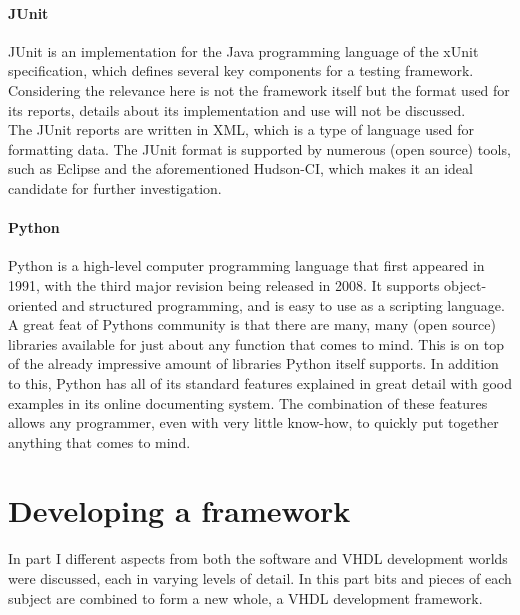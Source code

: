 \documentclass[11pt,british]{article}
\begin{document}
\subsection{JUnit}
JUnit is an implementation for the Java programming language of the xUnit specification, which defines several key components for a testing framework. Considering the relevance here is not the framework itself but the format used for its reports, details about its implementation and use will not be discussed.\\
The JUnit reports are written in \gls{XML}, which is a type of language used for formatting data. The JUnit format is supported by numerous (open source) tools, such as Eclipse and the aforementioned Hudson-CI, which makes it an ideal candidate for further investigation. 

\subsection{Python}
Python is a high-level computer programming language that first appeared in 1991, with the third major revision being released in 2008. It supports object-oriented and structured programming, and is easy to use as a scripting language. A great feat of Pythons community is that there are many, many (open source) libraries available for just about any function that comes to mind. This is on top of the already impressive amount of libraries Python itself supports. In addition to this, Python has all of its standard features explained in great detail with good examples in its online documenting system. The combination of these features allows any programmer, even with very little know-how, to quickly put together anything that comes to mind.


\newpage
\part{Developing a framework}
In part I different aspects from both the software and \gls{VHDL} development worlds were discussed, each in  varying levels of detail. In this part bits and pieces of each subject are combined to form a new whole, a VHDL development framework.
\end{document}
